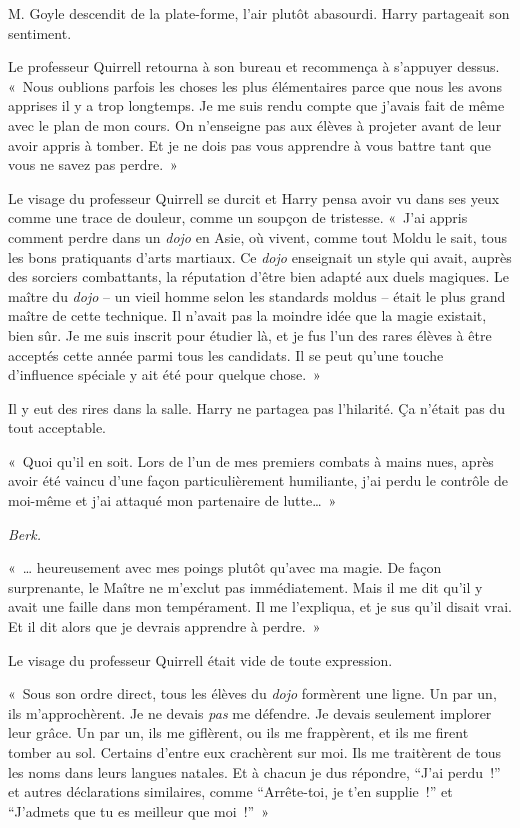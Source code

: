 M. Goyle descendit de la plate-forme, l'air plutôt abasourdi.
Harry partageait son sentiment.

Le professeur Quirrell retourna à son bureau et recommença à s'appuyer dessus.
«~Nous oublions parfois les choses les plus élémentaires parce que nous les avons apprises il y a trop longtemps.
Je me suis rendu compte que j'avais fait de même avec le plan de mon cours.
On n'enseigne pas aux élèves à projeter avant de leur avoir appris à tomber.
Et je ne dois pas vous apprendre à vous battre tant que vous ne savez pas perdre.~»

Le visage du professeur Quirrell se durcit et Harry pensa avoir vu dans ses yeux comme une trace de douleur, comme un soupçon de tristesse.
«~J'ai appris comment perdre dans un \emph{dojo} en Asie, où vivent, comme tout Moldu le sait, tous les bons pratiquants d'arts martiaux.
Ce \emph{dojo} enseignait un style qui avait, auprès des sorciers combattants, la réputation d'être bien adapté aux duels magiques.
Le maître du \emph{dojo} -- un vieil homme selon les standards moldus -- était le plus grand maître de cette technique.
Il n'avait pas la moindre idée que la magie existait, bien sûr.
Je me suis inscrit pour étudier là, et je fus l'un des rares élèves à être acceptés cette année parmi tous les candidats.
Il se peut qu'une touche d'influence spéciale y ait été pour quelque chose.~»

Il y eut des rires dans la salle.
Harry ne partagea pas l'hilarité.
Ça n'était pas du tout acceptable.

«~Quoi qu'il en soit.
Lors de l'un de mes premiers combats à mains nues, après avoir été vaincu d'une façon particulièrement humiliante, j'ai perdu le contrôle de moi-même et j'ai attaqué mon partenaire de lutte…~»

\emph{Berk.}

«~… heureusement avec mes poings plutôt qu'avec ma magie.
De façon surprenante, le Maître ne m'exclut pas immédiatement.
Mais il me dit qu'il y avait une faille dans mon tempérament.
Il me l'expliqua, et je sus qu'il disait vrai.
Et il dit alors que je devrais apprendre à perdre.~»

Le visage du professeur Quirrell était vide de toute expression.

«~Sous son ordre direct, tous les élèves du \emph{dojo} formèrent une ligne.
Un par un, ils m'approchèrent.
Je ne devais \emph{pas} me défendre.
Je devais seulement implorer leur grâce.
Un par un, ils me giflèrent, ou ils me frappèrent, et ils me firent tomber au sol.
Certains d'entre eux crachèrent sur moi.
Ils me traitèrent de tous les noms dans leurs langues natales.
Et à chacun je dus répondre, “J'ai perdu~!” et autres déclarations similaires, comme “Arrête-toi, je t'en supplie~!” et “J'admets que tu es meilleur que moi~!”~»

